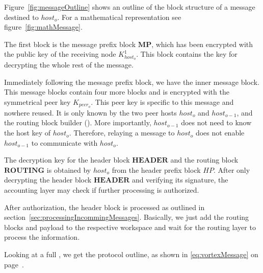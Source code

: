Figure~\ref{fig:messageOutline} shows an outline of the block structure of a message destined to $host_o$. For a mathematical representation see figure~\ref{fig:mathMessage}.

The first block is the message prefix block $\mathbf{MP}$, which has been encrypted with the public key of the receiving node $K^1_{host_o}$. This block contains the key for decrypting the whole rest of the message. 

Immediately following the message prefix block, we have the inner message block. This message blocks contain four more blocks and is encrypted with the symmetrical peer key $K_{peer_o}$. This peer key is specific to this message and nowhere reused. It is only known by the two peer hosts $host_o$ and $host_{o-1}$, and the routing block builder (). More importantly, $host_{o-1}$ does not need to know the host key of $host_o$. Therefore, relaying a message to $host_o$ does not enable $host_{o-1}$ to communicate with $host_o$. 

The decryption key for the header block $\mathbf{HEADER}$ and the routing block $\mathbf{ROUTING}$ is obtained by $host_o$ from the header prefix block $HP$. After only decrypting the header block $\mathbf{HEADER}$ and verifying its signature, the accounting layer may check if further processing is authorized. 

After authorization, the header block is processed as outlined in section~\ref{sec:processingIncommingMessages}. Basically, we just add the routing blocks and payload to the respective workspace and wait for the routing layer to process the information.

Looking at a full \VortexMessage, we get the protocol outline, as shown in \eqref{eq:vortexMessage} on page~\pageref{eq:vortexMessage}.

